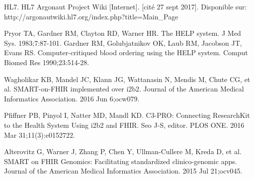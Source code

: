 \documentclass{amia}
\begin{document}
\begin{thebibliography}{1}
HL7. HL7 Argonaut Project Wiki [Internet]. [cité 27 sept 2017]. Disponible sur: http://argonautwiki.hl7.org/index.php?title=Main\_Page

Pryor TA, Gardner RM, Clayton RD, Warner HR. The HELP system. J Med Sys. 1983;7:87-101.
Gardner RM, Golubjatnikov OK, Laub RM, Jacobson JT, Evans RS. Computer-critiqued blood ordering using the HELP system. Comput Biomed Res 1990;23:514-28.

Wagholikar KB, Mandel JC, Klann JG, Wattanasin N, Mendis M, Chute CG, et al. SMART-on-FHIR implemented over i2b2. Journal of the American Medical Informatics Association. 2016 Jun 6;ocw079. 

Pfiffner PB, Pinyol I, Natter MD, Mandl KD. C3-PRO: Connecting ResearchKit to the Health System Using i2b2 and FHIR. Seo J-S, editor. PLOS ONE. 2016 Mar 31;11(3):e0152722. 

Alterovitz G, Warner J, Zhang P, Chen Y, Ullman-Cullere M, Kreda D, et al. SMART on FHIR Genomics: Facilitating standardized clinico-genomic apps. Journal of the American Medical Informatics Association. 2015 Jul 21;ocv045. 

\end{thebibliography}
\end{document}

